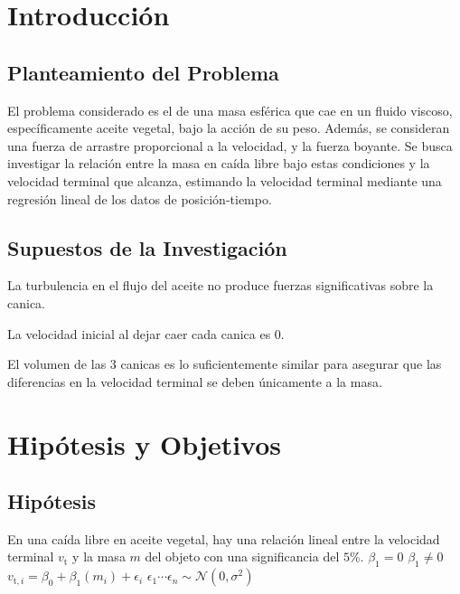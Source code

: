 \documentclass[12pt,a4paper]{config/myConfig}
\begin{document}
\section{Introducción}
\label{sec:INTRODUCCION}
\subsection{Planteamiento del Problema}
El problema considerado es el de una masa esférica que cae en un fluido viscoso,
específicamente aceite vegetal, bajo la acción de su peso. Además, se consideran 
una fuerza de arrastre proporcional a la velocidad, y la fuerza 
boyante. Se busca investigar la relación entre la masa en caída libre bajo estas
condiciones y la velocidad terminal que alcanza, estimando la velocidad terminal mediante una regresión lineal de los datos de posición-tiempo.
\label{sec:PLANTAMIENTO-PROBLEMA}

\subsection{Supuestos de la Investigación}
\label{sec:SUPUESTOS}

\begin{supuestos}
  \item \label{su:uno} La turbulencia en el flujo del aceite no produce fuerzas 
  significativas sobre la canica. 
  \item \label{su:dos} La velocidad inicial al dejar caer cada canica es 0.
  \item \label{su:tres} El volumen de las 3 canicas es lo suficientemente similar para asegurar que las diferencias en la velocidad terminal se deben únicamente 
  a la masa. 
\end{supuestos}

\section{Hipótesis y Objetivos}
\label{sec:HIPOTESIS-OBJECTIVOS}

\subsection{Hipótesis}
\label{sec:HIPOTESIS}

\begin{hipotesis}
  {En una caída libre en aceite vegetal, hay una relación lineal entre la velocidad terminal $v_{\text{t}}$ y la masa $m$ del objeto con una significancia del $5$\%. } %
  {$\beta_1 = 0$} %
  {$\beta_1 \neq 0$} %
  {$v_{\text{t},i} = \beta_0 + \beta_1(m_i) + \epsilon_i$ } %
  {$\epsilon_1 \cdots \epsilon_n \sim \mathcal{N}(0,\sigma^2)$} %
\end{hipotesis}
\end{document}
